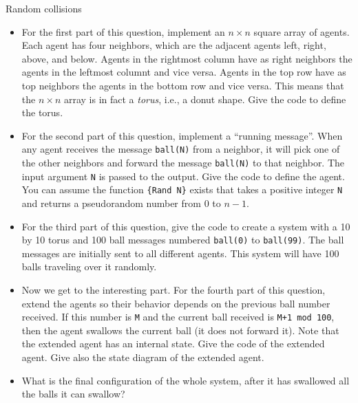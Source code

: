 \begin{Q2}{Random collisions}
  \begin{itemize}
    \item For the first part of this question,
      implement an $n \times n$ square array of agents.
      Each agent has four neighbors,
      which are the adjacent agents left, right, above, and below.
      Agents in the rightmost column have as right neighbors the agents
      in the leftmost columnt and vice versa.
      Agents in the top row have as top neighbors the agents in the bottom row and vice versa.
      This means that the $n \times n$ array is in fact a \emph{torus}, i.e., a donut shape.
      Give the code to define the torus.
    \item For the second part of this question,
      implement a ``running message''.
      When any agent receives the message \lstinline|ball(N)| from a neighbor,
      it will pick one of the other neighbors and forward the message
      \lstinline|ball(N)| to that neighbor.
      The input argument \lstinline|N| is passed to the output.
      Give the code to define the agent.
      You can assume the function \lstinline|{Rand N}| exists
      that takes a positive integer \lstinline|N| and returns
      a pseudorandom number from $0$ to $n-1$.
    \item For the third part of this question,
      give the code to create a system with a 10 by 10 torus
      and 100 ball messages numbered \lstinline|ball(0)|
      to \lstinline|ball(99)|.
      The ball messages are initially sent to all different
      agents.
      This system will have 100 balls traveling over it randomly.
    \item Now we get to the interesting part.
      For the fourth part of this question, extend the agents
      so their behavior depends on the previous ball number received.
      If this number is \lstinline|M| and the current ball
      received is \lstinline|M+1 mod 100|, then the agent swallows
      the current ball (it does not forward it).
      Note that the extended agent has an internal state.
      Give the code of the extended agent.
      Give also the state diagram of the extended agent.
    \item What is the final configuration of the whole system,
      after it has swallowed all the balls it can swallow?
  \end{itemize}
\end{Q2}

